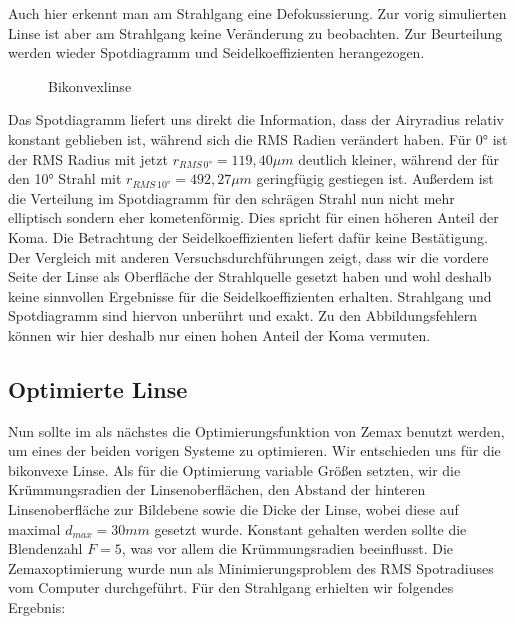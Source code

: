 \documentclass[twoside,colorback,accentcolor=tud4c,11pt]{tudreport}
\begin{document}
	Auch hier erkennt man am Strahlgang eine Defokussierung. Zur vorig simulierten Linse ist aber am Strahlgang keine Veränderung zu beobachten. Zur Beurteilung werden wieder Spotdiagramm und Seidelkoeffizienten herangezogen.
	
	\begin{figure}[H]
\centering
  \quad
  \quad   
  \caption{Bikonvexlinse}
\end{figure}
	
	Das Spotdiagramm liefert uns direkt die Information, dass der Airyradius relativ konstant geblieben ist, während sich die RMS Radien verändert haben. Für 0° ist der RMS Radius mit jetzt $r_{RMS \, 0°} = 119,40 \mu m $ deutlich kleiner, während der für den 10° Strahl mit $r_{RMS \, 10°} = 492,27 \mu m$ geringfügig gestiegen ist. Außerdem ist die Verteilung im Spotdiagramm für den schrägen Strahl nun nicht mehr elliptisch sondern eher kometenförmig. Dies spricht für einen höheren Anteil der Koma. Die Betrachtung der Seidelkoeffizienten liefert dafür keine Bestätigung. Der Vergleich mit anderen Versuchsdurchführungen zeigt, dass wir die vordere Seite der Linse als Oberfläche der Strahlquelle gesetzt haben und wohl deshalb keine sinnvollen Ergebnisse für die Seidelkoeffizienten erhalten. Strahlgang und Spotdiagramm sind hiervon unberührt und exakt. 
	Zu den Abbildungsfehlern können wir hier deshalb nur einen hohen Anteil der Koma vermuten.
	
	\subsection{Optimierte Linse}
	
	Nun sollte im als nächstes die Optimierungsfunktion von Zemax benutzt werden, um eines der beiden vorigen Systeme zu optimieren. Wir entschieden uns für die bikonvexe Linse. Als für die Optimierung variable Größen setzten, wir die Krümmungsradien der Linsenoberflächen, den Abstand der hinteren Linsenoberfläche zur Bildebene sowie die Dicke der Linse, wobei diese auf maximal $d_{max} = 30 mm$ gesetzt wurde. Konstant gehalten werden sollte die Blendenzahl $F =5$, was vor allem die Krümmungsradien beeinflusst. Die Zemaxoptimierung wurde nun als Minimierungsproblem des RMS Spotradiuses vom Computer durchgeführt. Für den Strahlgang erhielten wir folgendes Ergebnis: 
	
\end{document}
